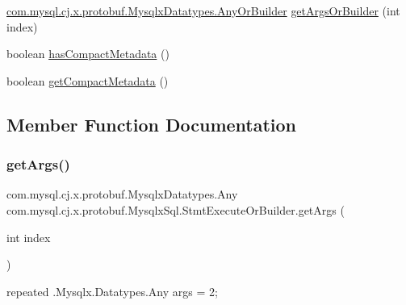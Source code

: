\begin{DoxyCompactItemize}
\item 
\mbox{\hyperlink{interfacecom_1_1mysql_1_1cj_1_1x_1_1protobuf_1_1_mysqlx_datatypes_1_1_any_or_builder}{com.\+mysql.\+cj.\+x.\+protobuf.\+Mysqlx\+Datatypes.\+Any\+Or\+Builder}} \mbox{\hyperlink{interfacecom_1_1mysql_1_1cj_1_1x_1_1protobuf_1_1_mysqlx_sql_1_1_stmt_execute_or_builder_af183e4c942f84bc15ca3d5d81de904b1}{get\+Args\+Or\+Builder}} (int index)
\item 
boolean \mbox{\hyperlink{interfacecom_1_1mysql_1_1cj_1_1x_1_1protobuf_1_1_mysqlx_sql_1_1_stmt_execute_or_builder_ae91f7df4887065488289d03879219dc4}{has\+Compact\+Metadata}} ()
\item 
boolean \mbox{\hyperlink{interfacecom_1_1mysql_1_1cj_1_1x_1_1protobuf_1_1_mysqlx_sql_1_1_stmt_execute_or_builder_ac71458d28981b8de3c8c56214899f713}{get\+Compact\+Metadata}} ()
\end{DoxyCompactItemize}


\subsection{Member Function Documentation}
\mbox{\label{interfacecom_1_1mysql_1_1cj_1_1x_1_1protobuf_1_1_mysqlx_sql_1_1_stmt_execute_or_builder_aa20b6613191f83fba25928bdd2a773e5}} 
\subsubsection{\texorpdfstring{get\+Args()}{getArgs()}}
{\footnotesize\ttfamily com.\+mysql.\+cj.\+x.\+protobuf.\+Mysqlx\+Datatypes.\+Any com.\+mysql.\+cj.\+x.\+protobuf.\+Mysqlx\+Sql.\+Stmt\+Execute\+Or\+Builder.\+get\+Args (\begin{DoxyParamCaption}\item[{int}]{index }\end{DoxyParamCaption})}

{\ttfamily repeated .Mysqlx.\+Datatypes.\+Any args = 2;} \mbox{\label{interfacecom_1_1mysql_1_1cj_1_1x_1_1protobuf_1_1_mysqlx_sql_1_1_stmt_execute_or_builder_ae1a9558edd6f330717e07c6e3358719b}} 

